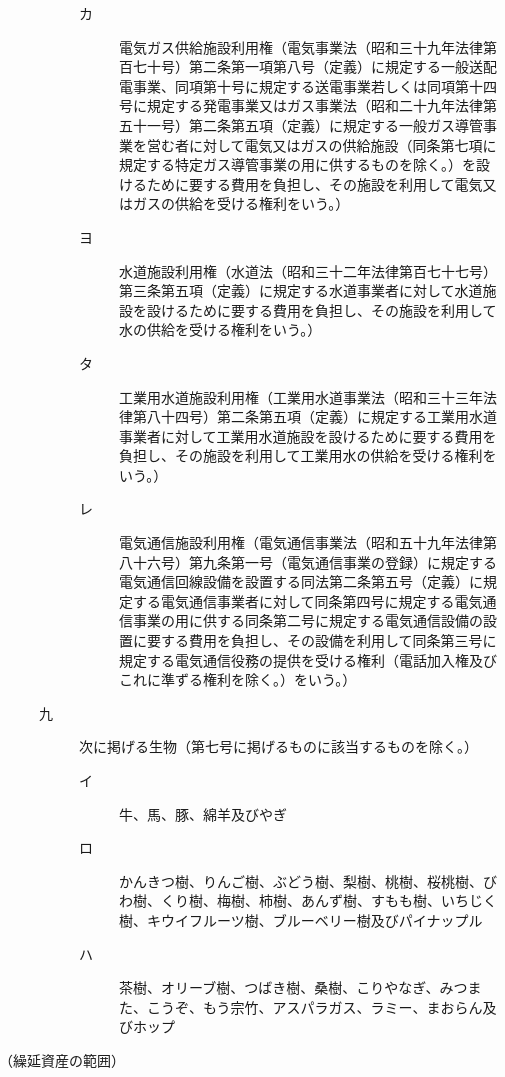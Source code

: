 \documentclass[twocolumn,a4j,10pt]{ltjtarticle}
\begin{document}
\begin{description}
\begin{description}
\begin{description}
\item[カ]電気ガス供給施設利用権（電気事業法（昭和三十九年法律第百七十号）第二条第一項第八号（定義）に規定する一般送配電事業、同項第十号に規定する送電事業若しくは同項第十四号に規定する発電事業又はガス事業法（昭和二十九年法律第五十一号）第二条第五項（定義）に規定する一般ガス導管事業を営む者に対して電気又はガスの供給施設（同条第七項に規定する特定ガス導管事業の用に供するものを除く。）を設けるために要する費用を負担し、その施設を利用して電気又はガスの供給を受ける権利をいう。）
\item[ヨ]水道施設利用権（水道法（昭和三十二年法律第百七十七号）第三条第五項（定義）に規定する水道事業者に対して水道施設を設けるために要する費用を負担し、その施設を利用して水の供給を受ける権利をいう。）
\item[タ]工業用水道施設利用権（工業用水道事業法（昭和三十三年法律第八十四号）第二条第五項（定義）に規定する工業用水道事業者に対して工業用水道施設を設けるために要する費用を負担し、その施設を利用して工業用水の供給を受ける権利をいう。）
\item[レ]電気通信施設利用権（電気通信事業法（昭和五十九年法律第八十六号）第九条第一号（電気通信事業の登録）に規定する電気通信回線設備を設置する同法第二条第五号（定義）に規定する電気通信事業者に対して同条第四号に規定する電気通信事業の用に供する同条第二号に規定する電気通信設備の設置に要する費用を負担し、その設備を利用して同条第三号に規定する電気通信役務の提供を受ける権利（電話加入権及びこれに準ずる権利を除く。）をいう。）
\end{description}
\item[九]次に掲げる生物（第七号に掲げるものに該当するものを除く。）
\begin{description}
\item[イ]牛、馬、豚、綿羊及びやぎ
\item[ロ]かんきつ樹、りんご樹、ぶどう樹、梨樹、桃樹、桜桃樹、びわ樹、くり樹、梅樹、柿樹、あんず樹、すもも樹、いちじく樹、キウイフルーツ樹、ブルーベリー樹及びパイナップル
\item[ハ]茶樹、オリーブ樹、つばき樹、桑樹、こりやなぎ、みつまた、こうぞ、もう宗竹、アスパラガス、ラミー、まおらん及びホップ
\end{description}
\end{description}
\end{description}
\noindent\hspace{10pt}（繰延資産の範囲）
\end{document}
